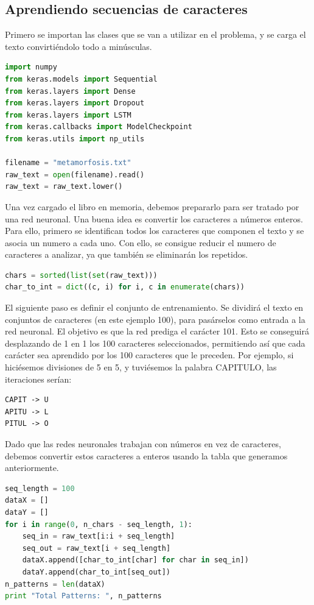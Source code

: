 \subsection{Aprendiendo secuencias de caracteres}
Primero se importan las clases que se van a utilizar en el problema, y se carga el texto convirtiéndolo todo a minúsculas.
\begin{lstlisting}[language=Python]
import numpy
from keras.models import Sequential
from keras.layers import Dense
from keras.layers import Dropout
from keras.layers import LSTM
from keras.callbacks import ModelCheckpoint
from keras.utils import np_utils

filename = "metamorfosis.txt"
raw_text = open(filename).read()
raw_text = raw_text.lower()
\end{lstlisting}
Una vez cargado el libro en memoria, debemos prepararlo para ser tratado por una red neuronal. Una buena idea es convertir los caracteres a números enteros. Para ello, primero se identifican todos los caracteres que componen el texto y se asocia un numero a cada uno. Con ello, se consigue reducir el numero de caracteres a analizar, ya que también se eliminarán los repetidos.
\begin{lstlisting}[language=Python]
chars = sorted(list(set(raw_text)))
char_to_int = dict((c, i) for i, c in enumerate(chars))
\end{lstlisting}
El siguiente paso es definir el conjunto de entrenamiento. Se dividirá el texto en conjuntos de caracteres (en este ejemplo 100), para pasárselos como entrada a la red neuronal. El objetivo es que la red prediga el carácter 101. Esto se conseguirá desplazando de 1 en 1 los 100 caracteres seleccionados, permitiendo así que cada carácter sea aprendido por los 100 caracteres que le preceden. Por ejemplo, si hiciésemos divisiones de 5 en 5, y tuviésemos la palabra CAPITULO, las iteraciones serían:
\begin{verbatim}
CAPIT -> U
APITU -> L
PITUL -> O
\end{verbatim}
Dado que las redes neuronales trabajan con números en vez de caracteres, debemos convertir estos caracteres a enteros usando la tabla que generamos anteriormente.
\begin{lstlisting}[language=Python]
seq_length = 100
dataX = []
dataY = []
for i in range(0, n_chars - seq_length, 1):
	seq_in = raw_text[i:i + seq_length]
	seq_out = raw_text[i + seq_length]
	dataX.append([char_to_int[char] for char in seq_in])
	dataY.append(char_to_int[seq_out])
n_patterns = len(dataX)
print "Total Patterns: ", n_patterns
\end{lstlisting}
